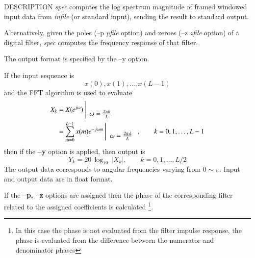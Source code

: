 \begin{synopsis}
 \item[spec]   [ --l $L$ ] [ --m $M$ ] [ --n $N$ ] [ --z {\em zfile} ]
               [ --p {\em pfile} ]
 \item[\ ~~~~] [ --e $E$ ] [ --o $O$ ] [ {\em infile} ]
\end{synopsis}

\begin{qsection}{DESCRIPTION}
{\em spec} computes the log spectrum magnitude of framed windowed input data 
from {\em infile} (or standard input), 
sending the result to standard output.

Alternatively, given the poles (--p {\em pfile} option) 
and zeroes (--z {\em zfile} option) of a digital filter, 
{\em spec} computes the frequency response of that filter.

The output format is specified by the --y option.

If the input sequence is
\begin{displaymath}
  x(0), x(1), \dots, x(L-1)
\end{displaymath}
and the FFT algorithm is used to evaluate
\begin{align}
  X_k &= X(e^{j\omega}) \left|
	\begin{array}{c}
	\\
        \omega=\frac{2\pi k}{L}
	\end{array}
    \right. \notag \\
          &= \sum_{m=0}^{L-1}x(m)e^{-j\omega m} \left|
	\begin{array}{c}
	\\
        \omega=\frac{2\pi\, k}{L}
	\end{array}
    \right., \qquad k=0,1,\dots,L-1 \notag
\end{align}
then if the {\bf --y} option is applied, then
output is
\begin{displaymath}
  Y_k=20\,\log_{10}\,|X_k|,\qquad k=0,1,\dots,L/2
\end{displaymath}
The output data corresponds to angular frequencies varying from $0\sim \pi$.
Input and output data are in float format.
\par
If the {\bf --p, --z} options are assigned
then the phase of the corresponding filter related to
the assigned coefficients is calculated
\footnote{
In this case the phase is not evaluated from the filter
impulse response, the phase is evaluated from
the difference between the numerator and denominator phases}.
\end{qsection}


